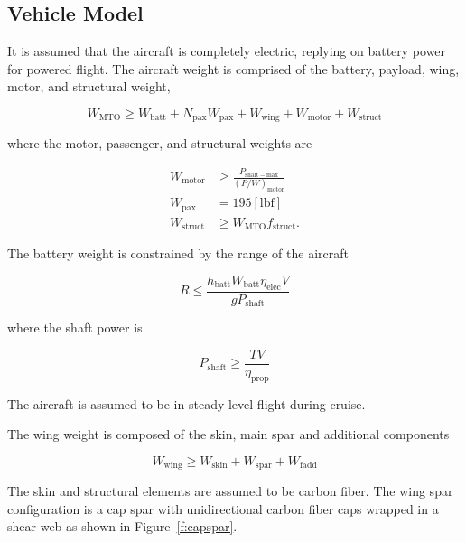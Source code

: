 \documentclass[]{aiaa-tc}%
\begin{document}
\subsection{Vehicle Model}

It is assumed that the aircraft is completely electric, replying on battery power for powered flight. 
The aircraft weight is comprised of the battery, payload, wing, motor, and structural weight,

\begin{equation}
    W_{\mathrm{MTO}} \geq W_{\mathrm{batt}} + N_{\mathrm{pax}}W_{\mathrm{pax}} + W_{\mathrm{wing}} + W_{\mathrm{motor}} + W_{\mathrm{struct}}
\end{equation}

where the motor, passenger, and structural weights are

\begin{align}
    W_{\mathrm{motor}} &\geq \frac{P_{\mathrm{shaft-max}}}{(P/W)_{\mathrm{motor}}} \\
    W_{\mathrm{pax}} &= 195 \mathrm{[lbf]} \\
    W_{\mathrm{struct}} &\geq W_{\mathrm{MTO}}f_{\mathrm{struct}}.
\end{align}

The battery weight is constrained by the range of the aircraft

\begin{equation}
    R \leq \frac{h_{\mathrm{batt}} W_{\mathrm{batt}} \eta_{\mathrm{elec}} V}{gP_{\mathrm{shaft}}}
\end{equation}

where the shaft power is 

\begin{equation}
    P_{\mathrm{shaft}} \geq \frac{TV}{\eta_{\mathrm{prop}}}
\end{equation}

The aircraft is assumed to be in steady level flight during cruise. 

The wing weight is composed of the skin, main spar and additional components

\begin{equation}
    W_{\mathrm{wing}} \geq W_{\mathrm{skin}} + W_{\mathrm{spar}} + W_{\mathrm{fadd}}
\end{equation}

The skin and structural elements are assumed to be carbon fiber.  
The wing spar configuration is a cap spar with unidirectional carbon fiber caps wrapped in a shear web as shown in Figure~\ref{f:capspar}.  
\end{document}

